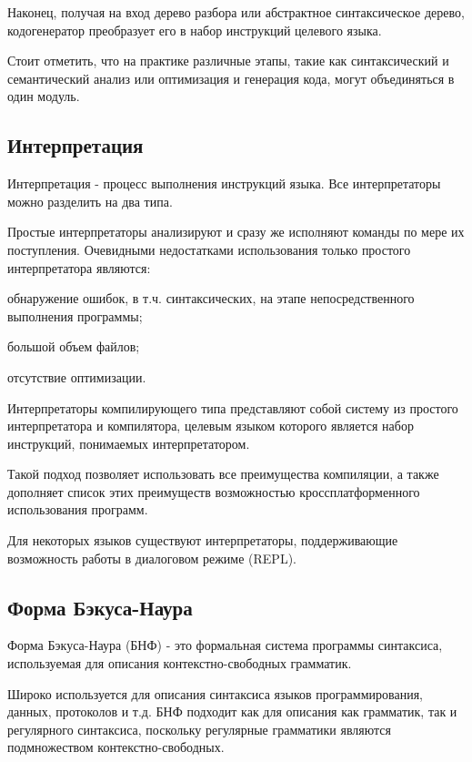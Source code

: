 Наконец, получая на вход дерево разбора или абстрактное синтаксическое дерево, кодогенератор преобразует его в набор инструкций целевого языка.

Стоит отметить, что на практике различные этапы, такие как синтаксический и семантический анализ или оптимизация и генерация кода, могут объединяться в один модуль.

\subsection{Интерпретация}

Интерпретация - процесс выполнения инструкций языка. Все интерпретаторы можно разделить на два типа.

Простые интерпретаторы анализируют и сразу же исполняют команды по мере их поступления. Очевидными недостатками использования только простого интерпретатора являются:
\begin{itemize*}
	\item обнаружение ошибок, в т.ч. синтаксических, на этапе непосредственного выполнения программы;
	\item большой объем файлов;
	\item отсутствие оптимизации.
\end{itemize*}

Интерпретаторы компилирующего типа представляют собой систему из простого интерпретатора и компилятора, целевым языком которого является набор инструкций, понимаемых интерпретатором.

Такой подход позволяет использовать все преимущества компиляции, а также дополняет список этих преимуществ возможностью кроссплатформенного использования программ.

Для некоторых языков существуют интерпретаторы, поддерживающие возможность работы в диалоговом режиме (REPL).



 
\subsection{Форма Бэкуса-Наура}

Форма Бэкуса-Наура (БНФ) - это формальная система программы синтаксиса, используемая для описания контекстно-свободных грамматик.


Широко используется для описания синтаксиса языков программирования, данных, протоколов и т.д. БНФ подходит как для описания как грамматик, так и регулярного синтаксиса, поскольку регулярные грамматики являются подмножеством контекстно-свободных.

